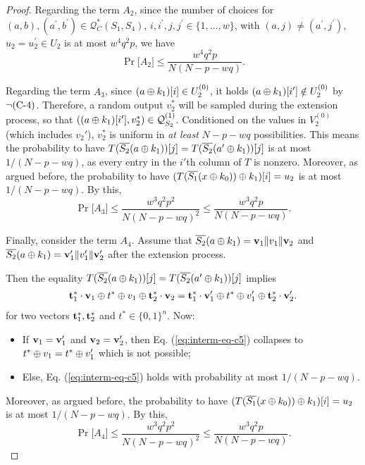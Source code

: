 \begin{proof}
Regarding the term $A_2$, since the number of choices for $(a, b), (a^{\prime}, b^{\prime}) \in \mathcal{Q}_{C}^{*}\left(S_{1}, S_{4}\right)$, $i, i^{\prime},j, j^{\prime} \in\{1, \ldots, w\}$, with $(a, j) \neq \left(a^{\prime}, j^{\prime}\right)$, $u_{2}=u_{2}^{\prime} \in U_{2}$ is at most $w^4q^2p$, we have
%
$$\Pr\big[A_2\big]\leq\frac{w^4q^2p}{N(N-p-wq)}.$$








Regarding the term $A_3$, since $(a\oplus k_1)[i]\in U_2^{(0)}$, it holds $(a\oplus k_1)[i']\notin U_2^{(0)}$ by $\neg\text{(C-4)}$. Therefore, a random output $v_2^*$ will be sampled during the extension process, so that $((a\oplus k_1)[i'],v_2^*)\in\mathcal{Q}_{S_2}^{(1)}$. Conditioned on the values in $V_2^{(0)}$ (which includes $v_2'$), $v_2^*$ is uniform in {\it at least} $N-p-wq$ possibilities. This means the probability to have $T(\overline{S_2}(a\oplus k_1))[j]=T(\overline{S_2}(a'\oplus k_1))[j]$ is at most $1/(N-p-wq)$, as every entry in the $i'$th column of $T$ is nonzero. Moreover, as argued before, the probability to have $(T(\overline{S_1}(x\oplus k_0))\oplus k_1)[i]=u_2$ is at most $1/(N-p-wq)$. By this,
%
$$\Pr\big[A_3\big]\leq\frac{w^3q^2p^2}{N(N-p-wq)^2}\leq\frac{w^3q^2p}{N(N-p-wq)}.$$




Finally, consider the term $A_4$. Assume that $\overline{S_2}(a\oplus k_1)=\mathbf{v}_1\|v_1\|\mathbf{v}_2$ and
$\overline{S_2}(a\oplus k_1)=\mathbf{v}_1'\|v_1'\|\mathbf{v}_2'$ after the extension process.

Then the equality $T(\overline{S_2}(a\oplus k_1))[j]=T(\overline{S_2}(a'\oplus k_1))[j]$ implies
%
%
\begin{align}
\mathbf{t}_1^*\cdot\mathbf{v}_1\oplus t^*\oplus v_1\oplus\mathbf{t}_2^*\cdot\mathbf{v}_2=\mathbf{t}_1^*\cdot\mathbf{v}_1'\oplus t^*\oplus v_1'\oplus\mathbf{t}_2^*\cdot\mathbf{v}_2'.
\label{eq:interm-eq-c5}
\end{align}
%
%
for two vectors $\mathbf{t}_1^*,\mathbf{t}_2^*$ and $t^*\in\{0,1\}^n$. Now:
\begin{itemize}
	\item If $\mathbf{v}_1=\mathbf{v}_1'$ and $\mathbf{v}_2=\mathbf{v}_2'$, then Eq. (\ref{eq:interm-eq-c5}) collapses to $t^*\oplus v_1=t^*\oplus v_1'$ which is not possible;
	\item Else, Eq. (\ref{eq:interm-eq-c5}) holds with probability at most $1/(N-p-wq)$.
\end{itemize}
Moreover, as argued before, the probability to have $(T(\overline{S_1}(x\oplus k_0))\oplus k_1)[i]=u_2$ is at most $1/(N-p-wq)$. By this,
%
$$\Pr\big[A_4\big]\leq\frac{w^3q^2p^2}{N(N-p-wq)^2}\leq\frac{w^3q^2p}{N(N-p-wq)}.$$
%
%


\end{proof}
